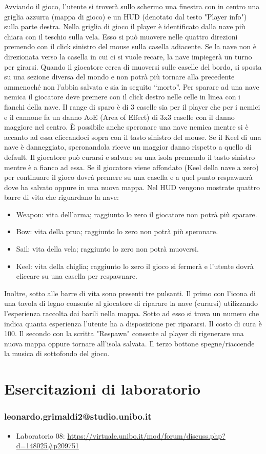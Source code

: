 \documentclass[a4paper,12pt]{report}
\begin{document}
Avviando il gioco, l'utente si troverà sullo schermo una finestra con in centro una griglia azzurra (mappa di gioco) e un HUD (denotato dal testo "Player info") sulla parte destra.
%
Nella griglia di gioco il player è identificato dalla nave più chiara con il teschio sulla vela.
%
Esso si può muovere nelle quattro direzioni premendo con il click sinistro del mouse sulla casella adiacente.
%
Se la nave non è direzionata verso la casella in cui ci si vuole recare, la nave impiegerà un turno per girarsi.
%
Quando il giocatore cerca di muoversi sulle caselle del bordo, si sposta su una sezione diversa del mondo e non potrà più tornare alla precedente ammenoché non l'abbia salvata e sia in seguito ``morto''.
%
Per sparare ad una nave nemica il giocatore deve premere con il click destro nelle celle in linea con i fianchi della nave.
%
Il range di sparo è di 3 caselle sia per il player che per i nemici e il cannone fa un danno AoE (Area of Effect) di 3x3 caselle con il danno maggiore nel centro.
%
È possibile anche speronare una nave nemica mentre si è accanto ad essa cliccandoci sopra con il tasto sinistro del mouse.
%
Se il Keel di una nave è danneggiato, speronandola riceve un maggior danno rispetto a quello di default.
%
Il giocatore può curarsi e salvare su una isola premendo il tasto sinistro mentre è a fianco ad essa.
%
Se il giocatore viene affondato (Keel della nave a zero) per continuare il gioco dovrà premere su una casella e a quel punto respawnerà dove ha salvato oppure in una nuova mappa.
%
\newline
Nel HUD vengono mostrate quattro barre di vita che riguardano la nave:
\begin{itemize}
	\item Weapon: vita dell'arma; raggiunto lo zero il giocatore non potrà più sparare.
	\item Bow: vita della prua; raggiunto lo zero non potrà più speronare.
	\item Sail: vita della vela; raggiunto lo zero non potrà muoversi.
	\item Keel: vita della chiglia; raggiunto lo zero il gioco si fermerà e l'utente dovrà cliccare su una casella per respawnare.
\end{itemize}
Inoltre, sotto alle barre di vita sono presenti tre pulsanti.
%
Il primo con l'icona di una tavola di legno consente al giocatore di riparare la nave (curarsi) utilizzando l'esperienza raccolta dai barili nella mappa.
%
Sotto ad esso si trova un numero che indica quanta esperienza l'utente ha a disposizione per ripararsi. Il costo di cura è 100.
%
Il secondo con la scritta "Respawn" consente al player di rigenerare una nuova mappa oppure tornare all'isola salvata.
%
Il terzo bottone spegne/riaccende la musica di sottofondo del gioco.

\chapter{Esercitazioni di laboratorio}
\subsection{leonardo.grimaldi2@studio.unibo.it}

\begin{itemize}
 \item Laboratorio 08: \url{https://virtuale.unibo.it/mod/forum/discuss.php?d=148025#p209751}
\end{itemize}



\end{document}
